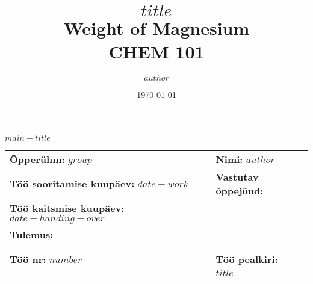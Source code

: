 \documentclass[
	a4paper, %
	12pt, %
	onecolumn
]{CSUniSchoolLabReport}
\title{$title$ \\ Weight of Magnesium \\ CHEM 101} %
\author{$author$} %
\date{\today} %
\begin{document}
\setlength{\parskip}{12pt}
\begin{center}
\textbf{\textsf{$main-title$}} \\
\end{center}
\vspace{1cm}
\renewcommand{\arraystretch}{1}
\setlength\arrayrulewidth{1pt}
\begin{tabular}{|m{}|m{}|m{}|}
\hline
    {\textbf{Õpperühm:} $group$} & \multicolumn{2}{|m{0.84\textwidth}|}{\textbf{Nimi:} $author$}  \\ \cline{1-3}
    \multicolumn{2}{|m{0.59\textwidth}|}{\raggedright\textbf{Töö sooritamise kuupäev:} $date-work$} & {\textbf{Vastutav õppejõud:}} \\ \cline{1-2}
    \multicolumn{2}{|m{0.59\textwidth}|}{\raggedright\textbf{Töö kaitsmise kuupäev:} $date-handing-over$} & \\
    \multicolumn{2}{|m{0.59\textwidth}|}{\textbf{Tulemus:} } & \\
    \multicolumn{2}{|m{0.59\textwidth}|}{} & \\
    \multicolumn{2}{|m{.59\textwidth}|}{} & \\ \hline
    {\textbf{Töö nr:} $number$} & \multicolumn{2}{|m{0.84\textwidth}|}{\textbf{Töö pealkiri:}} \\
    {} & \multicolumn{2}{|m{0.84\textwidth}|}{\textbf{$title$}} \\ \hline
\end{tabular}
\begin{comment}
\begin{center}
	\begin{tabular}{l r}
		Date Performed: & February 13, 2022 \\ %
		Partners: & Cecilia \textsc{Smith} \\ %
		& Tajel \textsc{Khumalo} \\
		Instructor: & Professor \textsc{Rivera} %
	\end{tabular}
\end{center}
\end{comment}
\end{document}
